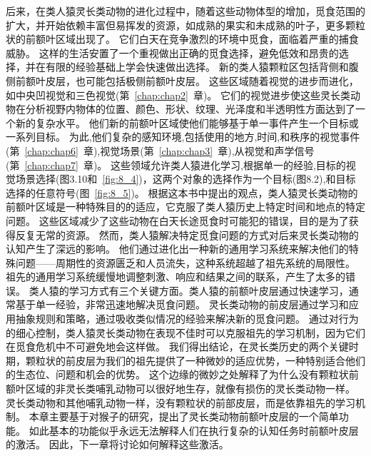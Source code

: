 后来，在类人猿灵长类动物的进化过程中，随着这些动物体型的增加，觅食范围的扩大，并开始依赖丰富但易挥发的资源，如成熟的果实和未成熟的叶子，更多颗粒状的前额叶区域出现了。
它们白天在竞争激烈的环境中觅食，面临着严重的捕食威胁。
这样的生活安置了一个重视做出正确的觅食选择，避免低效和昂贵的选择，并在有限的经验基础上学会快速做出选择。
新的类人猿颗粒区包括背侧和腹侧前额叶皮层，也可能包括极侧前额叶皮层。
这些区域随着视觉的进步而进化，如中央凹视觉和三色视觉(第~\ref{chap:chap2}~章)。
它们的视觉进步使这些灵长类动物在分析视野内物体的位置、颜色、形状、纹理、光泽度和半透明性方面达到了一个新的复杂水平。
他们新的前额叶区域使他们能够基于单一事件产生一个目标或一系列目标。
为此,他们复杂的感知环境,包括使用的地方,时间,和秩序的视觉事件(第~\ref{chap:chap6}~章),视觉场景(第~\ref{chap:chap3}~章),从视觉和声学信号(第~\ref{chap:chap7}~章)。
这些领域允许类人猿进化学习,根据单一的经验,目标的视觉场景选择(图3.10和~\ref{fig:8_4})，这两个对象的选择作为一个目标(图8.2),和目标选择的任意符号(图~\ref{fig:8_5})。
根据这本书中提出的观点，类人猿灵长类动物的前额叶区域是一种特殊目的的适应，它克服了类人猿历史上特定时间和地点的特定问题。
这些区域减少了这些动物在白天长途觅食时可能犯的错误，目的是为了获得反复无常的资源。
然而，类人猿解决特定觅食问题的方式对后来灵长类动物的认知产生了深远的影响。
他们通过进化出一种新的通用学习系统来解决他们的特殊问题——周期性的资源匮乏和人员流失，这种系统超越了祖先系统的局限性。
祖先的通用学习系统缓慢地调整刺激、响应和结果之间的联系，产生了太多的错误。
类人猿的学习方式有三个关键方面。类人猿的前额叶皮层通过快速学习，通常基于单一经验，非常迅速地解决觅食问题。
灵长类动物的前皮层通过学习和应用抽象规则和策略，通过吸收类似情况的经验来解决新的觅食问题。
通过对行为的细心控制，类人猿灵长类动物在表现不佳时可以克服祖先的学习机制，因为它们在觅食危机中不可避免地会这样做。
我们得出结论，在灵长类历史的两个关键时期，颗粒状的前皮层为我们的祖先提供了一种微妙的适应优势，一种特别适合他们的生态位、问题和机会的优势。
这个边缘的微妙之处解释了为什么没有颗粒状前额叶区域的非灵长类哺乳动物可以很好地生存，就像有损伤的灵长类动物一样。
灵长类动物和其他哺乳动物一样，没有颗粒状的前部皮层，而是依靠祖先的学习机制。
本章主要基于对猴子的研究，提出了灵长类动物前额叶皮层的一个简单功能。
如此基本的功能似乎永远无法解释人们在执行复杂的认知任务时前额叶皮层的激活。
因此，下一章将讨论如何解释这些激活。










